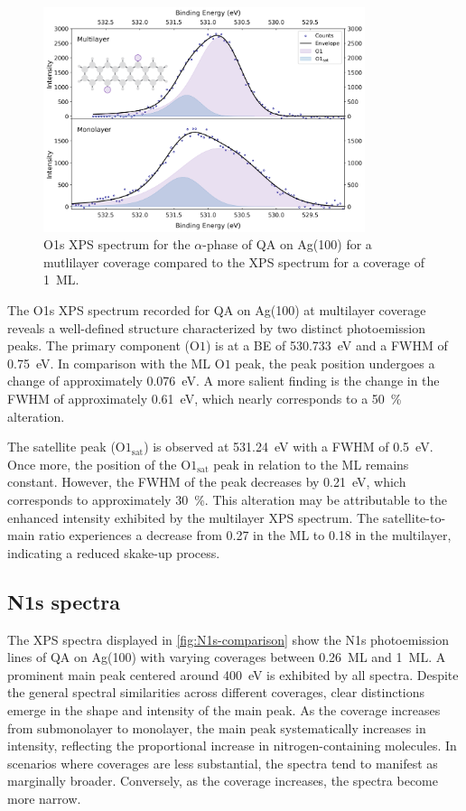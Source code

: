 \begin{figure}[H]
	\centering
	\includegraphics[width=0.84\textwidth]{images/O1s-multilayer.png}
	\caption{O1s \ac{XPS} spectrum for the $\alpha$-phase of \ac{QA} on Ag(100) for a mutlilayer coverage compared to the \ac{XPS} spectrum for a coverage of 1~\ac{ML}.}
	\label{fig:O1s-alpha-multilayer}
\end{figure}

The O1s \ac{XPS} spectrum recorded for \ac{QA} on Ag(100) at multilayer coverage reveals a well-defined structure characterized by two distinct photoemission peaks. The primary component ($\mathrm{O1}$) is at a \ac{BE} of 530.733~\si{\eV} and a \ac{FWHM} of 0.75~\si{\eV}. In comparison with the \ac{ML} $\mathrm{O1}$ peak, the peak position undergoes a change of approximately 0.076~\si{\eV}. A more salient finding is the change in the \ac{FWHM} of approximately 0.61~\si{\eV}, which nearly corresponds to a 50~\% alteration.

 The satellite peak ($\mathrm{O1_{sat}}$) is observed at 531.24~\si{\eV} with a \ac{FWHM} of 0.5~\si{\eV}. Once more, the position of the $\mathrm{O1_{sat}}$ peak in relation to the \ac{ML} remains constant. However, the \ac{FWHM} of the peak decreases by 0.21~\si{\eV}, which corresponds to approximately 30~\%. This alteration may be attributable to the enhanced intensity exhibited by the multilayer \ac{XPS} spectrum. The satellite-to-main ratio experiences a decrease from 0.27 in the \ac{ML} to 0.18 in the multilayer, indicating a reduced skake-up process.

\cleardoublepage
\subsection{N1s spectra}

The \ac{XPS} spectra displayed in \autoref{fig:N1s-comparison} show the N1s photoemission lines of \ac{QA} on Ag(100) with varying coverages between 0.26~\ac{ML} and 1~\ac{ML}. A prominent main peak centered around 400~\si{\eV} is exhibited by all spectra. Despite the general spectral similarities across different coverages, clear distinctions emerge in the shape and intensity of the main peak. As the coverage increases from submonolayer to monolayer, the main peak systematically increases in intensity, reflecting the proportional increase in nitrogen-containing molecules. In scenarios where coverages are less substantial, the spectra tend to manifest as marginally broader. Conversely, as the coverage increases, the spectra become more narrow.


